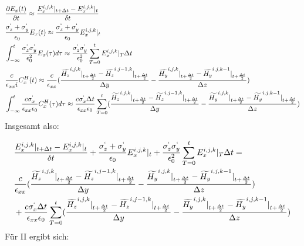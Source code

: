 \documentclass[11pt, ngerman]{article}
\begin{document}
\begin{align}
	&\frac{\partial E_x(t)}{\partial t} \approx \frac{\Ef{x}{i,j,k}{+} - \Ef{x}{i,j,k}{0}}{\delta t}\\
	&\frac{\sgma_z + \sgma_y}{\epsilon_0}E_x(t) \approx \frac{\sgma_z + \sgma_y}{\epsilon_0}\Ef{x}{i,j,k}{0}\\
	&\int_{-\infty}^t\frac{\sgma_z\sgma_y}{\epsilon_0^2}E_x(\tau)d\tau \approx \frac{\sgma_z\sgma_y}{\epsilon_0^2}\sum_{T=0}^t\Ef{x}{i,j,k}{T}\Delta t\\
	&\frac{c}{\epsilon_{xx}i}C_x^H(t) \approx \frac{c}{\epsilon_{xx}}(\frac{\Hf{z}{i,j,k}{+} - \Hf{z}{i,j-1,k}{+}}{\Delta y} - \frac{\Hf{y}{i,j,k}{+} - \Hf{y}{i,j,k-1}{+}}{\Delta z})\\
	&\int_{-\infty}^t\frac{c\sgma_x}{\epsilon_{xx}\epsilon_0}C_x^H(\tau)d\tau \approx \frac{c\sgma_x\Delta t}{\epsilon_{xx}\epsilon_0}\sum_{T = 0}^t(\frac{\Hf{z}{i,j,k}{+}-\Hf{z}{i,j-1,k}{+}}{\Delta y}-\frac{\Hf{y}{i,j,k}{+}-\Hf{y}{i,j,k-1}{+}}{\Delta z})
\end{align}
Insgesamt also:

\begin{align}
	&\frac{\Ef{x}{i,j,k}{+} - \Ef{x}{i,j,k}{0}}{\delta t}+\frac{\sgma_z + \sgma_y}{\epsilon_0}\Ef{x}{i,j,k}{0}+\frac{\sgma_z\sgma_y}{\epsilon_0^2}\sum_{T=0}^t\Ef{x}{i,j,k}{T}\Delta t =\\
	&\frac{c}{\epsilon_{xx}}(\frac{\Hf{z}{i,j,k}{+} - \Hf{z}{i,j-1,k}{+}}{\Delta y} - \frac{\Hf{y}{i,j,k}{+} - \Hf{y}{i,j,k-1}{+}}{\Delta z})\\
	&+\frac{c\sgma_x\Delta t}{\epsilon_{xx}\epsilon_0}\sum_{T = 0}^t(\frac{\Hf{z}{i,j,k}{+}-\Hf{z}{i,j-1,k}{+}}{\Delta y}-\frac{\Hf{y}{i,j,k}{+}-\Hf{y}{i,j,k-1}{+}}{\Delta z})
\end{align}
\newpage
\noindent F\"ur II ergibt sich:
\end{document}
